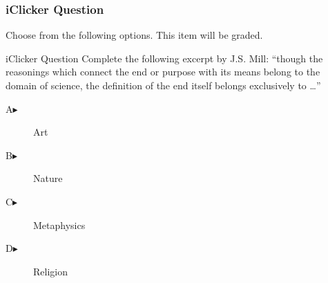 \begin{frame}
  \frametitle{iClicker Question}
Choose from the following options. This item will be graded.
\begin{block}{iClicker Question}
Complete the following excerpt by J.S. Mill: ``though the reasonings
which connect the end or purpose with its means belong to the
domain of science, the definition of the end itself belongs
exclusively to {\ldots}''
\end{block}
\begin{description}
\item[A\hspace{.2in}$\blacktriangleright$] Art
\item[B\hspace{.2in}$\blacktriangleright$] Nature
\item[C\hspace{.2in}$\blacktriangleright$] Metaphysics
\item[D\hspace{.2in}$\blacktriangleright$] Religion
\end{description}
\end{frame}
